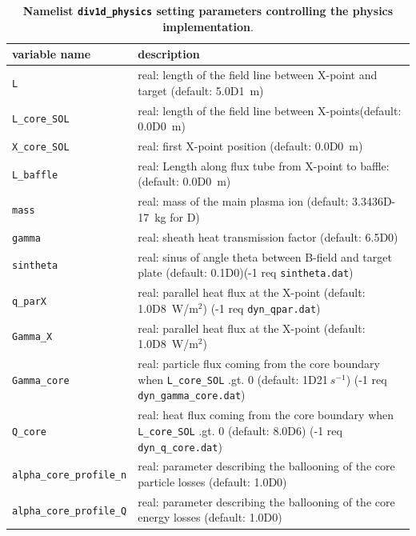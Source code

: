 \documentclass[amsmath,amssymb,a4]{revtex4-2}
\begin{document}
  \FloatBarrier
\newpage
    \begin{longtable}{| p{} | p{} |} 
    \caption{{\bf Namelist {\tt div1d\_physics} setting parameters controlling the physics implementation}.}
    \hline
    {variable name }              & description \\ \hline \hline 
    {\tt L}                       & real: length of the field line between X-point and target (default: 5.0D1~m) \\ \hline
    {\tt L\_core\_SOL}            & real: length of the field line between X-points(default: 0.0D0~m) \\ \hline
    {\tt X\_core\_SOL}            & real: first X-point position (default: 0.0D0~m) \\ \hline
    {\tt L\_baffle}               & real: Length along flux tube from X-point to baffle: (default: 0.0D0~m) \\ \hline
    {\tt mass}                    & real: mass of the main plasma ion (default: 3.3436D-17~kg for D) \\ \hline
    {\tt gamma}                   & real: sheath heat transmission factor (default: 6.5D0) \\ \hline
    {\tt sintheta}                & real: sinus of angle theta between B-field and target plate (default: 0.1D0)(-1 req {\tt sintheta.dat}) \\ \hline
    {\tt q\_parX}                 & real: parallel heat flux at the X-point (default: 1.0D8~W/m$^2$)  (-1 req {\tt dyn\_qpar.dat})  \\ \hline
    {\tt Gamma\_X}                & real: parallel heat flux at the X-point (default: 1.0D8~W/m$^2$) \\ \hline
    {\tt Gamma\_core}             & real:  particle flux coming from the core boundary when {\tt L\_core\_SOL} .gt. 0 (default: 1D21$ ~s^{-1}$)  (-1 req {\tt dyn\_gamma\_core.dat})  \\ \hline
    {\tt Q\_core}                 & real: heat flux coming from the core boundary when {\tt L\_core\_SOL} .gt. 0  (default: 8.0D6)  (-1 req {\tt dyn\_q\_core.dat})  \\ \hline
    {\tt alpha\_core\_profile\_n}  & real:  parameter describing the ballooning of the core particle losses (default: 1.0D0) \\ \hline
    {\tt alpha\_core\_profile\_Q}  & real:  parameter describing the ballooning of the core energy losses (default: 1.0D0) \\ \hline

\end{longtable}
\end{document}
